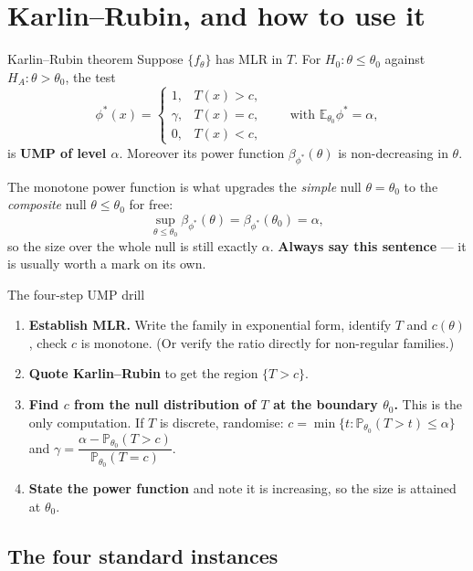 \documentclass[11pt]{article}
\newcommand{\E}{\mathbb{E}}
\newcommand{\Prob}{\mathbb{P}}
\begin{document}
\section{Karlin--Rubin, and how to use it}

\begin{idea}{Karlin--Rubin theorem}
Suppose $\{f_\theta\}$ has MLR in $T$. For $H_0:\theta\le\theta_0$ against
$H_A:\theta>\theta_0$, the test
\[
\phi^*(x)=\begin{cases}1,&T(x)>c,\\ \gamma,&T(x)=c,\\ 0,&T(x)<c,\end{cases}
\qquad\text{with }\E_{\theta_0}\phi^*=\alpha,
\]
is \textbf{UMP of level $\alpha$}. Moreover its power function $\beta_{\phi^*}(\theta)$ is
non-decreasing in $\theta$.
\end{idea}

The monotone power function is what upgrades the \emph{simple} null $\theta=\theta_0$ to the
\emph{composite} null $\theta\le\theta_0$ for free:
\[
\sup_{\theta\le\theta_0}\beta_{\phi^*}(\theta)=\beta_{\phi^*}(\theta_0)=\alpha ,
\]
so the size over the whole null is still exactly $\alpha$. \textbf{Always say this sentence} ---
it is usually worth a mark on its own.

\begin{recipe}{The four-step UMP drill}
\begin{enumerate}
\item \textbf{Establish MLR.} Write the family in exponential form, identify $T$ and $c(\theta)$,
check $c$ is monotone. (Or verify the ratio directly for non-regular families.)
\item \textbf{Quote Karlin--Rubin} to get the region $\{T>c\}$.
\item \textbf{Find $c$ from the null distribution of $T$ at the boundary $\theta_0$.}
This is the only computation. If $T$ is discrete, randomise:
$c=\min\{t:\Prob_{\theta_0}(T>t)\le\alpha\}$ and
$\gamma=\dfrac{\alpha-\Prob_{\theta_0}(T>c)}{\Prob_{\theta_0}(T=c)}$.
\item \textbf{State the power function} and note it is increasing, so the size is attained at
$\theta_0$.
\end{enumerate}
\end{recipe}

\subsection{The four standard instances}
\end{document}
